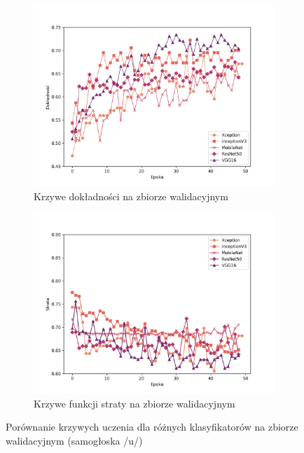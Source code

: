\begin{figure}[ht]
    \centering
    \begin{subfigure}{0.49\textwidth}
        \centering
        \includegraphics[width=\textwidth]{./img/results/u_acc}
        \caption{Krzywe dokładności na zbiorze walidacyjnym\@}
        \label{fig:u_acc}
    \end{subfigure}
    \begin{subfigure}{0.49\textwidth}
        \centering
        \includegraphics[width=\textwidth]{./img/results/u_loss}
        \caption{Krzywe funkcji straty na zbiorze walidacyjnym\@}
        \label{fig:u_loss}
    \end{subfigure}

    \caption{Porównanie krzywych uczenia dla różnych klasyfikatorów na zbiorze walidacyjnym (samogłoska /u/)}
    \label{fig:u_results}
\end{figure}
